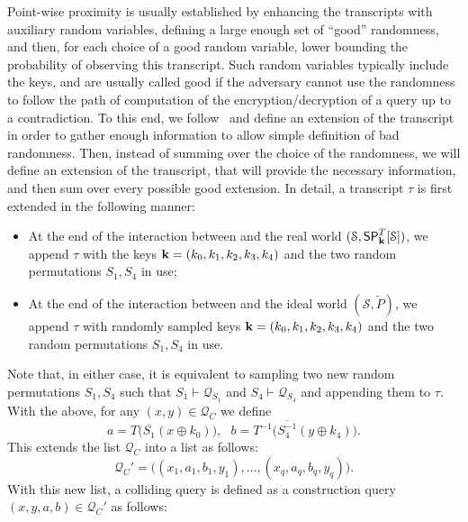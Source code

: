 Point-wise proximity is usually established by enhancing the transcripts with auxiliary random variables, defining a large enough set of ``good'' randomness, and then, for each choice of a good random variable, lower bounding the probability of observing this transcript. Such random variables typically include the keys, and are usually called good if the adversary cannot use the randomness to follow the path of computation of the encryption/decryption of a query up to a contradiction. To this end, we follow~\cite[Sect. 4.2]{C:CDKLST18} and define an extension of the transcript in order to gather enough information to allow simple definition of bad randomness. Then, instead of summing over the choice of the randomness, we will define an extension of the transcript, that will provide the necessary information, and then sum over every possible good extension. In detail, a transcript $\tau$ is first extended in the following manner:
\begin{itemize}
	\item At the end of the interaction between \dis and the real world $(\mathcal{S},\mathsf{SP}_{\mathbf{k}}^T[\mathcal{S}])$, we append $\tau$ with the keys $\mathbf{k}=(k_0,k_1,k_2,k_3,k_4)$ and the two random permutations $S_1,S_4$ in use;
	\item At the end of the interaction between \dis and the ideal world $(\mathcal{S},\widetilde{P})$, we append $\tau$ with randomly sampled keys $\mathbf{k}=(k_0,k_1,k_2,k_3,k_4)$ and the two random permutations $S_1,S_4$ in use.
\end{itemize}
Note that, in either case, it is equivalent to sampling two new random permutations $S_1,S_4$ such that $S_1\vdash\mathcal{Q}_{S_{1}}$ and $S_4\vdash\mathcal{Q}_{S_4}$ and appending them to $\tau$. With the above, for any $(x,y)\in\mathcal{Q}_C$ we define
%
$$a=T\big(\overline{S_1}\left(x \oplus k_{0}\right)\big),\ \ \  b=T^{-1}\big(\overline{S_{4}^{-1}}\left(y \oplus k_{4}\right)\big).$$
%
This extends the list $\mathcal{Q}_C$ into a list as follows:
%
$$\mathcal{Q}_C'=\big((x_1,a_1,b_1,y_1),\ldots,(x_q,a_q,b_q,y_q)\big).$$
%
With this new list, a colliding query is defined as a construction query $(x,y,a,b)\in\mathcal{Q}_C'$ as follows:
%
